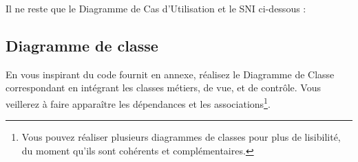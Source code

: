 \documentclass[12pt]{article}
\def\dc{\textsf{Diagramme de Classe}}
\def\uc{\textsf{Diagramme de Cas d'Utilisation}}
\def\sni{\textsf{SNI}}
\begin{document}
Il ne reste que le \uc{} et le \sni{} ci-dessous :



\subsection{Diagramme de classe}

En vous inspirant du code fournit en annexe, réalisez le \dc{} correspondant en intégrant les classes métiers, de vue, et de contrôle. Vous veillerez à faire apparaître les dépendances et les associations\footnote{Vous pouvez réaliser plusieurs diagrammes de classes pour plus de lisibilité, du moment qu'ils sont cohérents et complémentaires.}.
\end{document}
